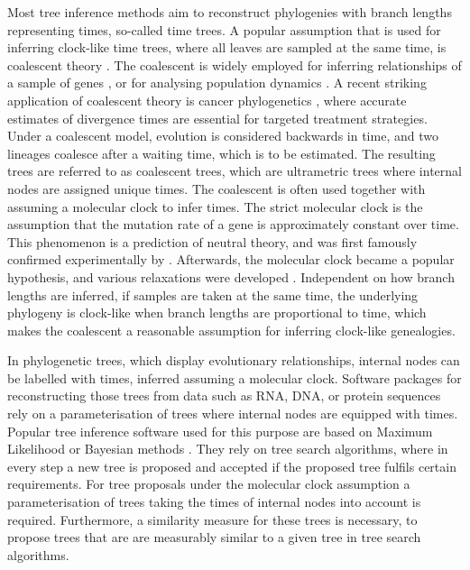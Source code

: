\documentclass[11pt]{amsart}
\newcommand{\summary}[1]{} %
\begin{document}
\summary{Molecular clock, divergence dating, and coalescent -- biological motivation}
Most tree inference methods aim to reconstruct phylogenies with branch lengths representing times, so-called time trees.
A popular assumption that is used for inferring clock-like time trees, where all leaves are sampled at the same time, is coalescent theory \autocite{Kingman1982-df}.
The coalescent is widely employed for inferring relationships of a sample of genes \autocite{Hudson1990-ki, Kuhner2009-jb}, or for analysing population dynamics \autocite{Kuhner1998-eh,Drummond2005-ak}.
A recent striking application of coalescent theory is cancer phylogenetics \autocite{Posada2020-aa, Ohtsuki2017-su}, where accurate estimates of divergence times are essential for targeted treatment strategies.
Under a coalescent model, evolution is considered backwards in time, and two lineages coalesce after a waiting time, which is to be estimated.
The resulting trees are referred to as coalescent trees, which are ultrametric trees where internal nodes are assigned unique times.
The coalescent is often used together with assuming a molecular clock to infer times.
The strict molecular clock is the assumption that the mutation rate of a gene is approximately constant over time.
This phenomenon is a prediction of neutral theory, and was first famously confirmed experimentally by \textcite{zuckerkandl1965evolutionary}.
Afterwards, the molecular clock became a popular hypothesis, and various relaxations were developed \autocite{Kumar2016-eu}.
Independent on how branch lengths are inferred, if samples are taken at the same time, the underlying phylogeny is clock-like when branch lengths are proportional to time, which makes the coalescent a reasonable assumption for inferring clock-like genealogies.

\summary{Software needs to deal with clock trees, tree proposals}
In phylogenetic trees, which display evolutionary relationships, internal nodes can be labelled with times, inferred assuming a molecular clock.
Software packages for reconstructing those trees from data such as RNA, DNA, or protein sequences rely on a parameterisation of trees where internal nodes are equipped with times.
Popular tree inference software used for this purpose are based on Maximum Likelihood \autocite{Kozlov2019-cf, Nguyen2015-sp, Tamura2011-ky} or Bayesian methods \autocite{Bouckaert2014-ir,Suchard2018-tw, Ronquist2003-eq}.
They rely on tree search algorithms, where in every step a new tree is proposed and accepted if the proposed tree fulfils certain requirements.
For tree proposals under the molecular clock assumption a parameterisation of trees taking the times of internal nodes into account is required.
Furthermore, a similarity measure for these trees is necessary, to propose trees that are are measurably similar to a given tree in tree search algorithms.
\end{document}
